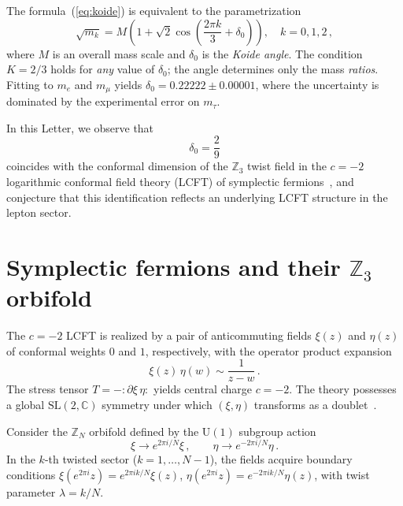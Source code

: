 \documentclass[aps,prl,twocolumn,superscriptaddress]{revtex4-2}
\begin{document}
The formula~(\ref{eq:koide}) is equivalent to the parametrization~\cite{Foot1994}
\begin{equation}
\sqrt{m_k} = M\left(1 + \sqrt{2}\cos\!\left(\frac{2\pi k}{3} + \delta_0\right)\right),
\quad k = 0,1,2\,,
\label{eq:param}
\end{equation}
where $M$ is an overall mass scale and $\delta_0$ is the \emph{Koide angle}. The condition
$K = 2/3$ holds for \emph{any} value of $\delta_0$; the angle determines only the mass
\emph{ratios}. Fitting to $m_e$ and $m_\mu$ yields $\delta_0 = 0.22222 \pm 0.00001$,
where the uncertainty is dominated by the experimental error on $m_\tau$.

In this Letter, we observe that
\begin{equation}
\boxed{\delta_0 = \frac{2}{9}}
\label{eq:main}
\end{equation}
coincides with the conformal dimension of the $\mathbb{Z}_3$ twist field in the $c = -2$
logarithmic conformal field theory (LCFT) of symplectic fermions~\cite{Kausch2000}, and
conjecture that this identification reflects an underlying LCFT structure in the lepton
sector.

\section{Symplectic fermions and their $\mathbb{Z}_3$ orbifold}

The $c=-2$ LCFT is realized by a pair of anticommuting fields $\xi(z)$ and $\eta(z)$
of conformal weights $0$ and $1$, respectively, with the operator product
expansion~\cite{Kausch1995,Kausch2000}
\begin{equation}
\xi(z)\,\eta(w) \sim \frac{1}{z - w}\,.
\end{equation}
The stress tensor $T = -\!:\!\partial\xi\,\eta\!:$ yields central charge $c = -2$.
The theory possesses a global $\mathrm{SL}(2,\mathbb{C})$ symmetry under which $(\xi,\eta)$
transforms as a doublet~\cite{Kausch2000}.

Consider the $\mathbb{Z}_N$ orbifold defined by the $\mathrm{U}(1)$ subgroup action
\begin{equation}
\xi \to e^{2\pi i/N}\xi\,, \qquad \eta \to e^{-2\pi i/N}\eta\,.
\label{eq:ZN}
\end{equation}
In the $k$-th twisted sector ($k = 1, \ldots, N-1$), the fields acquire boundary conditions
$\xi(e^{2\pi i}z) = e^{2\pi i k/N}\xi(z)$, $\eta(e^{2\pi i}z) = e^{-2\pi ik/N}\eta(z)$,
with twist parameter $\lambda = k/N$.
\end{document}
